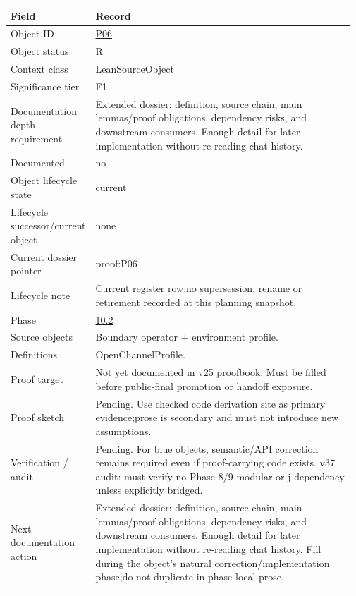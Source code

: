 \begin{longtable}{L{0.16\linewidth} L{0.81\linewidth}}
\hline
\textbf{Field} & \textbf{Record}\\
\hline
Object ID & \hyperlink{object-row-P06}{P06}\\
\hline\addlinespace[0.20em]
Object status & R\\
\hline\addlinespace[0.20em]
Context class & LeanSourceObject\\
\hline\addlinespace[0.20em]
Significance tier & F1\\
\hline\addlinespace[0.20em]
Documentation depth requirement & Extended dossier: definition, source chain, main lemmas/\allowbreak{}proof obligations, dependency risks, and downstream consumers. Enough detail for later implementation without re-reading chat history.\\
\hline\addlinespace[0.20em]
Documented & no\\
\hline\addlinespace[0.20em]
Object lifecycle state & current\\
\hline\addlinespace[0.20em]
Lifecycle successor/\allowbreak{}current object & none\\
\hline\addlinespace[0.20em]
Current dossier pointer & proof:P06\\
\hline\addlinespace[0.20em]
Lifecycle note & Current register row;\newline no supersession, rename or retirement recorded at this planning snapshot.\\
\hline\addlinespace[0.20em]
Phase & \hyperlink{phase-row-10-2}{10.2}\\
\hline\addlinespace[0.20em]
Source objects & Boundary operator + environment profile.\\
\hline\addlinespace[0.20em]
Definitions & OpenChannelProfile.\\
\hline\addlinespace[0.20em]
Proof target & Not yet documented in v25 proofbook. Must be filled before public-final promotion or handoff exposure.\\
\hline\addlinespace[0.20em]
Proof sketch & Pending. Use checked code derivation site as primary evidence;\newline prose is secondary and must not introduce new assumptions.\\
\hline\addlinespace[0.20em]
Verification /\allowbreak{} audit & Pending. For blue objects, semantic/\allowbreak{}API correction remains required even if proof-carrying code exists. v37 audit: must verify no Phase 8/\allowbreak{}9 modular or j dependency unless explicitly bridged.\\
\hline\addlinespace[0.20em]
Next documentation action & Extended dossier: definition, source chain, main lemmas/\allowbreak{}proof obligations, dependency risks, and downstream consumers. Enough detail for later implementation without re-reading chat history. Fill during the object's natural correction/\allowbreak{}implementation phase;\newline do not duplicate in phase-local prose.\\
\hline\addlinespace[0.20em]
\end{longtable}
